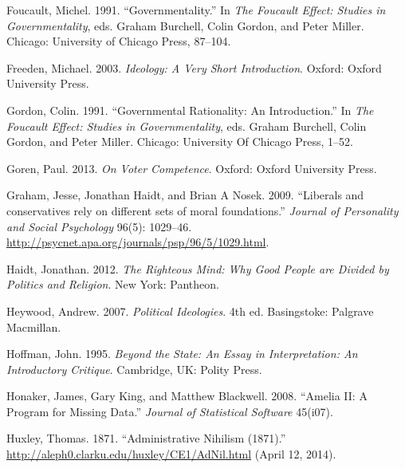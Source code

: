 \documentclass[12pt,]{article}
\begin{document}
Foucault, Michel. 1991. ``Governmentality.'' In \emph{The Foucault
Effect: Studies in Governmentality}, eds. Graham Burchell, Colin Gordon,
and Peter Miller. Chicago: University of Chicago Press, 87--104.

Freeden, Michael. 2003. \emph{Ideology: A Very Short Introduction}.
Oxford: Oxford University Press.

Gordon, Colin. 1991. ``Governmental Rationality: An Introduction.'' In
\emph{The Foucault Effect: Studies in Governmentality}, eds. Graham
Burchell, Colin Gordon, and Peter Miller. Chicago: University Of Chicago
Press, 1--52.

Goren, Paul. 2013. \emph{On Voter Competence}. Oxford: Oxford University
Press.

Graham, Jesse, Jonathan Haidt, and Brian A Nosek. 2009. ``Liberals and
conservatives rely on different sets of moral foundations.''
\emph{Journal of Personality and Social Psychology} 96(5): 1029--46.
\url{http://psycnet.apa.org/journals/psp/96/5/1029.html}.

Haidt, Jonathan. 2012. \emph{The Righteous Mind: Why Good People are
Divided by Politics and Religion}. New York: Pantheon.

Heywood, Andrew. 2007. \emph{Political Ideologies}. 4th ed. Basingstoke:
Palgrave Macmillan.

Hoffman, John. 1995. \emph{Beyond the State: An Essay in Interpretation:
An Introductory Critique}. Cambridge, UK: Polity Press.

Honaker, James, Gary King, and Matthew Blackwell. 2008. ``Amelia II: A
Program for Missing Data.'' \emph{Journal of Statistical Software}
45(i07).

Huxley, Thomas. 1871. ``Administrative Nihilism (1871).''
\url{http://aleph0.clarku.edu/huxley/CE1/AdNil.html} (April 12, 2014).
\end{document}
